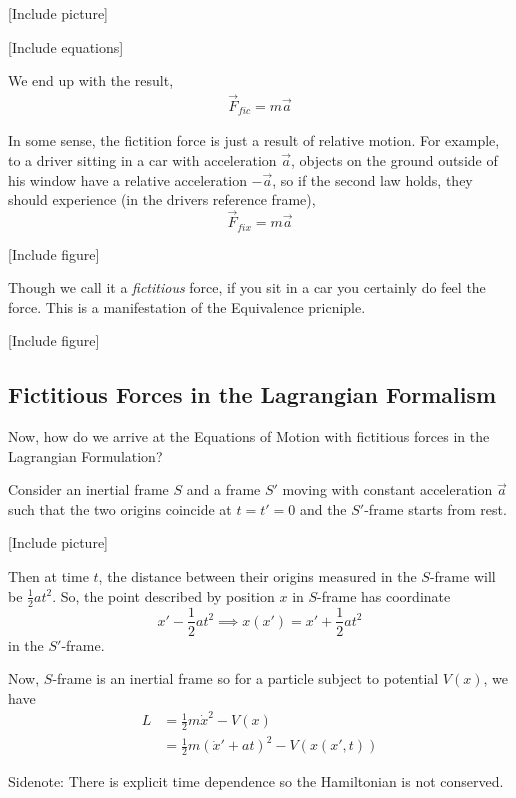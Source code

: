 \documentclass[11pt]{article}
\begin{document}
\vskip 0.5cm
[Include picture]
\vskip 0.5cm

[Include equations]

We end up with the result,
\begin{align*}
  \vec{F}_{fic} = m\vec{a}
\end{align*}

\vskip 0.5cm
In some sense, the fictition force is just a result of relative motion. For example, to a driver sitting in a car with acceleration $\vec{a}$, objects on the ground outside of his window have a relative acceleration $-\vec{a}$, so if the second law holds, they should experience (in the drivers reference frame), 
\[ \vec{F}_{fix} = m\vec{a} \]

\vskip 0.5cm
[Include figure]
\vskip 0.5cm


Though we call it a \emph{fictitious} force, if you sit in a car you certainly do feel the force. This is a manifestation of the Equivalence pricniple.

\vskip 0.5cm
[Include figure]
\vskip 0.5cm

\subsection{Fictitious Forces in the Lagrangian Formalism}
Now, how do we arrive at the Equations of Motion with fictitious forces in the Lagrangian Formulation?

\vskip 0.5cm
Consider an inertial frame $S$ and a frame $S'$ moving with constant acceleration $\vec{a}$ such that the two origins coincide at $t = t' = 0$ and the $S'$-frame starts from rest.

\vskip 0.5cm
[Include picture]
\vskip 0.5cm

Then at time $t$, the distance between their origins measured in the $S$-frame will be $\frac{1}{2}at^2$. So, the point described by position $x$ in $S$-frame has coordinate 
\[ x' - \frac{1}{2}at^2 \implies x(x') = x' + \frac{1}{2}at^2 \]
in the $S'$-frame.

\vskip 0.5cm
Now, $S$-frame is an inertial frame so for a particle subject to potential $V(x)$, we have 
\begin{align*}
  L &= \frac{1}{2} m \dot{x}^2 - V(x) \\
  &= \frac{1}{2} m \left( \dot{x}' + at \right)^2 - V(x(x', t))
\end{align*}

\begin{redbox}
  Sidenote: There is explicit time dependence so the Hamiltonian is not conserved.
\end{redbox}
\end{document}
